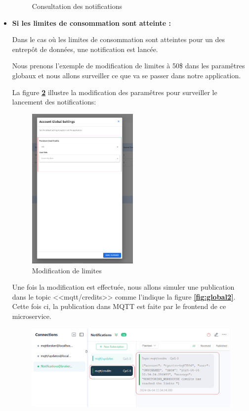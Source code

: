 \begin{itemize}
\begin{figure}[H]
\begin{tabular}[b]{c}
            \end{tabular}
            \caption{Consultation des notifications}
        \label{fig:step4}
        \end{figure}

    \item \textbf{Si les limites de consommation sont atteinte :}
    \par Dans le cas où les limites de consommation sont atteintes pour un des entrepôt de données, une notification est lancée. 
    \par Nous prenons l'exemple de modification de limites à 50\$ dans les paramêtres globaux et nous allons surveiller ce que va se passer dans notre application. 
    \par La figure \textbf{\ref{fig:global1}} illustre la modification des paramêtres pour surveiller le lancement des notifications:
    \begin{figure}[H]
        \centering
        \includegraphics[width=0.3\linewidth ,height=8cm]{img/captures/notifications/settings.png}
        \caption{Modification de limites}
        \label{fig:global1}
    \end{figure}
    \par Une fois la modification est effectuée, nous allons simuler une publication dans le topic <<mqtt/credits>> comme l'indique la figure \textbf{\ref{fig:global2}}. 
    \\ Cette fois ci, la publication dans MQTT est faite par le frontend de ce microservice.
    \begin{figure}[H]
        \centering
        \includegraphics[width =1\linewidth]{img/captures/notifications/mqtt_global.png}

\end{figure}
\end{itemize}
